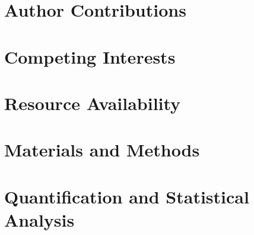 \documentclass[11pt]{elife}
\begin{document}
\begin{fullwidth}



\section{Author Contributions}




\section{Competing Interests}




\section{Resource Availability}




\section{Materials and Methods}




\section{Quantification and Statistical Analysis}





\end{fullwidth}
\end{document}
